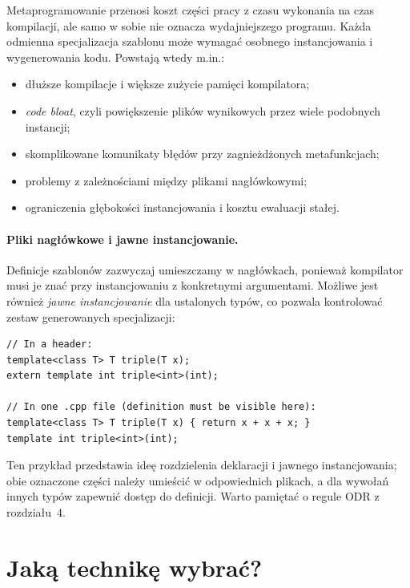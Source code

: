 Metaprogramowanie przenosi koszt części pracy z czasu wykonania na
czas kompilacji, ale samo w sobie nie oznacza wydajniejszego programu.
Każda odmienna specjalizacja szablonu może wymagać osobnego
instancjowania i wygenerowania kodu. Powstają wtedy m.in.:
\begin{itemize}
\item dłuższe kompilacje i większe zużycie pamięci kompilatora;
\item \emph{code bloat}, czyli powiększenie plików wynikowych przez wiele
podobnych instancji;
\item skomplikowane komunikaty błędów przy zagnieżdżonych metafunkcjach;
\item problemy z zależnościami między plikami nagłówkowymi;
\item ograniczenia głębokości instancjowania i kosztu ewaluacji stałej.
\end{itemize}

\paragraph{Pliki nagłówkowe i jawne instancjowanie.}
Definicje szablonów zazwyczaj umieszczamy w nagłówkach, ponieważ
kompilator musi je znać przy instancjowaniu z konkretnymi argumentami.
Możliwe jest również \emph{jawne instancjowanie} dla ustalonych typów,
co pozwala kontrolować zestaw generowanych specjalizacji:

\begin{lstlisting}
// In a header:
template<class T> T triple(T x);
extern template int triple<int>(int);

// In one .cpp file (definition must be visible here):
template<class T> T triple(T x) { return x + x + x; }
template int triple<int>(int);
\end{lstlisting}

Ten przykład przedstawia ideę rozdzielenia deklaracji i jawnego
instancjowania; obie oznaczone części należy umieścić w odpowiednich
plikach, a dla wywołań innych typów zapewnić dostęp do definicji.
Warto pamiętać o regule ODR z rozdziału~4.

\section{Jaką technikę wybrać?}

